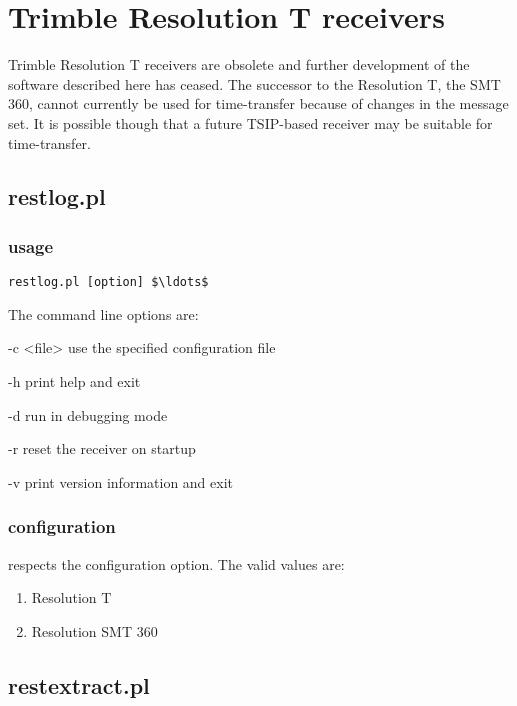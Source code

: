 \section{Trimble Resolution T receivers}

Trimble Resolution T receivers are obsolete and further development of the software
described here has ceased. The successor to the Resolution T, the SMT 360, 
cannot currently be used for time-transfer because of changes in the message set. 
It is possible though that a future TSIP-based receiver may be suitable for time-transfer.

\subsection{restlog.pl} \hypertarget{h:restlog}{}

\subsubsection{usage}

\begin{lstlisting}[mathescape=true]
restlog.pl [option] $\ldots$ 
\end{lstlisting}

The command line options are:
\begin{description*}
	\item[-c \textless{file}\textgreater] use the specified configuration file
	\item[-h] print help and exit
	\item[-d] run in debugging mode
	\item[-r] reset the receiver on startup
	\item[-v] print version information and exit
\end{description*}

\subsubsection{configuration}

 respects the  configuration option.
The valid values are:
\begin{enumerate}
	\item Resolution T
	\item Resolution SMT 360 
\end{enumerate}

\subsection{restextract.pl} \hypertarget{h:restextract}{}

